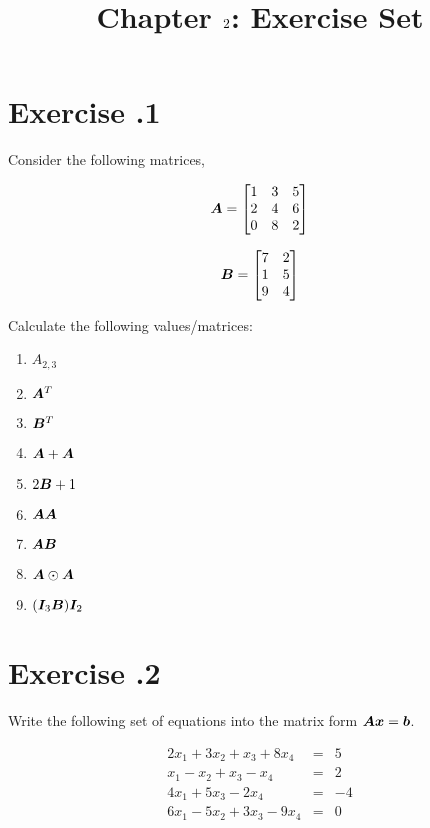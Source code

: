 \documentclass{article}
\title{Chapter $2$: Exercise Set}
\begin{document}
\maketitle

\section*{Exercise \chapnumber.1}
Consider the following matrices,

\begin{equation}
{\bm{A}}
=
\begin{bmatrix}
    1 & 3 & 5 \\
    2 & 4 & 6 \\
    0 & 8 & 2 
\end{bmatrix}
\end{equation}

\begin{equation}
{\bm{B}}
=
\begin{bmatrix}
    7 & 2 \\
    1 & 5 \\
    9 & 4 
\end{bmatrix}
\end{equation}

Calculate the following values/matrices:

\begin{enumerate}[label=(\alph*)]

\item $\textit{A}_{2,3}$
\item ${\bm{A}}^T$
\item ${\bm{B}}^T$
\item ${\bm{A}}+{\bm{A}}$
\item $2{\bm{B}}+1$
\item ${\bm{A}}{\bm{A}}$
\item ${\bm{A}}{\bm{B}}$
\item ${\bm{A}}\odot{\bm{A}}$
\item $({\bm{I}}_{3}{\bm{B}}){\bm{I}}_{2}$

\end{enumerate} 

\section*{Exercise \chapnumber.2}
Write the following set of equations into the matrix form ${\bm{A}} {\bm{x}} = {\bm{b}}$.

\begin{equation}
\begin{array}{rcr} 
2x_{1} + 3x_{2} + x_{3} + 8x_{4} & = & 5 \\
x_{1} - x_{2} + x_{3} - x_{4} & = & 2 \\
4x_{1} + 5x_{3} - 2x_{4}& = & -4 \\
6x_{1} - 5x_{2} + 3x_{3} - 9x_{4} & = & 0
\end{array}
\end{equation}
\end{document}
